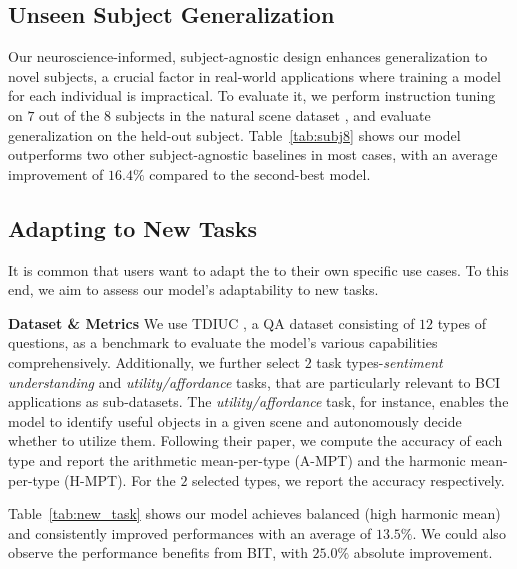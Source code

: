 \subsection{Unseen Subject Generalization}
Our neuroscience-informed, subject-agnostic design enhances generalization to novel subjects, a crucial factor in real-world applications where training a model for each individual is impractical. To evaluate it, we perform instruction tuning on $7$ out of the $8$ subjects in the natural scene dataset \cite{allen2022massive}, and evaluate generalization on the held-out subject. Table~\ref{tab:subj8} shows our model outperforms two other subject-agnostic baselines in most cases, with an average improvement of $16.4\%$ compared to the second-best model.

\subsection{Adapting to New Tasks}
It is common that users want to adapt the \name{} to their own specific use cases. To this end, we aim to assess our model's adaptability to new tasks.

\noindent\textbf{Dataset \& Metrics} We use TDIUC \cite{kafle2017analysis}, a QA dataset consisting of $12$ types of questions, as a benchmark to evaluate the model's various capabilities comprehensively. Additionally, we further select $2$ task types-\textit{sentiment understanding} and \textit{utility/affordance} tasks, that are particularly relevant to BCI applications as sub-datasets. The \textit{utility/affordance} task, for instance, enables the model to identify useful objects in a given scene and autonomously decide whether to utilize them. Following their paper, we compute the accuracy of each type and report the arithmetic mean-per-type (A-MPT) and the harmonic mean-per-type (H-MPT). For the $2$ selected types, we report the accuracy respectively. 

Table~\ref{tab:new_task} shows our model achieves balanced (high harmonic mean) and consistently improved performances with an average of $13.5\%$. We could also observe the performance benefits from BIT, with $25.0\%$ absolute improvement.

